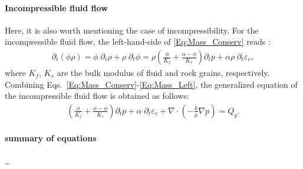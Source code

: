 \paragraph{Incompressible fluid flow} Here, it is also worth mentioning the case of incompressibility. For the incompressible fluid flow, the left-hand-side of \eqref{Eq:Mass_Conserv} reads \cite{detournay1995fundamentals}:
\begin{equation}\label{Eq:Mass_Left}
    \begin{aligned}
        \partial_t \left(\phi\rho\right) =
        \phi \; \partial_t  \rho+ \rho \; \partial_t \phi
        = \rho\left(\frac{\phi}{K_f}+\frac{\alpha -\phi}{K_s}\right)
       \partial_t p + \alpha\rho \;  \partial_t \varepsilon_v,
    \end{aligned}
\end{equation}
where $K_f$, $K_s$ are the bulk modulus of fluid and rock grains, respectively. 
Combining Eqs.~\eqref{Eq:Mass_Conserv}-\eqref{Eq:Mass_Left}, the generalized equation of the incompressible fluid flow is obtained as follows:
\begin{equation}\label{Eq:Mass_General}
    \begin{aligned}
        \left(\frac{\phi}{K_f}+\frac{\alpha -\phi}{K_s}\right) \partial_t p+  \alpha \; \partial_t \varepsilon_v+\nabla \cdot \left( -\frac{k}{\mu}\nabla p\right) =Q_g.
    \end{aligned}
\end{equation}

\paragraph{summary of equations}\dots
